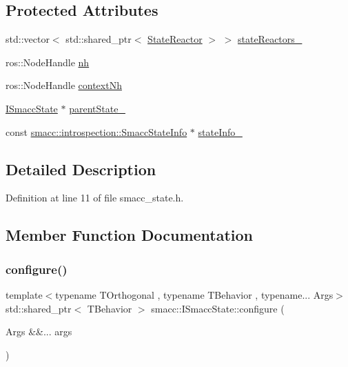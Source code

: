 \subsection*{Protected Attributes}
\begin{DoxyCompactItemize}
\item 
std\+::vector$<$ std\+::shared\+\_\+ptr$<$ \hyperlink{classsmacc_1_1StateReactor}{State\+Reactor} $>$ $>$ \hyperlink{classsmacc_1_1ISmaccState_a7410a353b515f7b7357e94ef619a6c45}{state\+Reactors\+\_\+}
\item 
ros\+::\+Node\+Handle \hyperlink{classsmacc_1_1ISmaccState_a13fe6e6abfdb87996402189d44b78494}{nh}
\item 
ros\+::\+Node\+Handle \hyperlink{classsmacc_1_1ISmaccState_ae59191a663a08489b7d10036f3b25238}{context\+Nh}
\item 
\hyperlink{classsmacc_1_1ISmaccState}{I\+Smacc\+State} $\ast$ \hyperlink{classsmacc_1_1ISmaccState_ad61db41d8d06a836e7d1dac7767f5695}{parent\+State\+\_\+}
\item 
const \hyperlink{classsmacc_1_1introspection_1_1SmaccStateInfo}{smacc\+::introspection\+::\+Smacc\+State\+Info} $\ast$ \hyperlink{classsmacc_1_1ISmaccState_af20df2cfd3aa826fe02a3d703dc63c1b}{state\+Info\+\_\+}
\end{DoxyCompactItemize}


\subsection{Detailed Description}


Definition at line 11 of file smacc\+\_\+state.\+h.



\subsection{Member Function Documentation}
\mbox{\label{classsmacc_1_1ISmaccState_ad129c58b69a90e7056f2b3c3fa139a24}} 
\subsubsection{\texorpdfstring{configure()}{configure()}}
{\footnotesize\ttfamily template$<$typename T\+Orthogonal , typename T\+Behavior , typename... Args$>$ \\
std\+::shared\+\_\+ptr$<$ T\+Behavior $>$ smacc\+::\+I\+Smacc\+State\+::configure (\begin{DoxyParamCaption}\item[{Args \&\&...}]{args }\end{DoxyParamCaption})}



